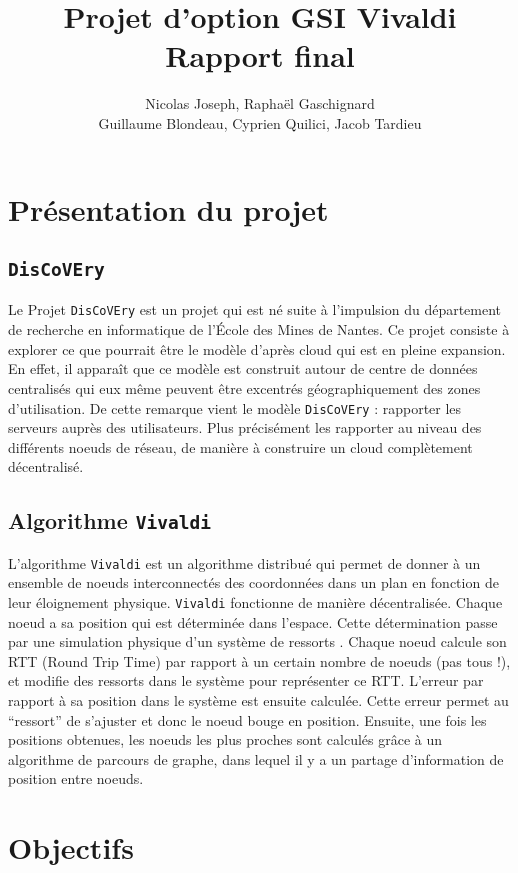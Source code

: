 \documentclass[11pt,a4paper]{article}
\title{Projet d'option GSI Vivaldi \\ Rapport final}
\author{Nicolas Joseph, Raphaël Gaschignard\\ Guillaume Blondeau, Cyprien Quilici, Jacob Tardieu}
\begin{document}
\maketitle
\section{Présentation du projet}
\subsection{\texttt{DisCoVEry}}

Le Projet \texttt{DisCoVEry} est un projet qui est né suite à l’impulsion du département de recherche en informatique de l'École des Mines de Nantes. Ce projet consiste à explorer ce que pourrait être le modèle d’après cloud qui est en pleine expansion. En effet, il apparaît que ce modèle est construit autour de centre de données centralisés qui eux même peuvent être excentrés géographiquement des zones d’utilisation. De cette remarque vient  le modèle \texttt{DisCoVEry} : rapporter les serveurs auprès des utilisateurs. Plus précisément les rapporter au niveau des différents noeuds de réseau, de manière à construire un cloud complètement décentralisé.

\subsection{Algorithme \texttt{Vivaldi}}
L'algorithme \texttt{Vivaldi} \cite{vivaldi} est un algorithme distribué qui permet  de donner à un ensemble de noeuds interconnectés des coordonnées dans un plan en fonction de leur éloignement physique.
\texttt{Vivaldi} fonctionne de manière décentralisée. Chaque noeud a sa position qui est déterminée dans l’espace. Cette détermination passe par une simulation physique d’un système de ressorts . Chaque noeud calcule son RTT (Round Trip Time) par rapport à un certain nombre de noeuds (pas tous !), et modifie des ressorts dans le système pour représenter ce RTT. L’erreur par rapport à sa position dans le système est ensuite calculée. Cette erreur permet au “ressort” de s’ajuster et donc le noeud bouge en position.
Ensuite, une fois les positions obtenues, les noeuds les plus proches sont calculés grâce à un algorithme de parcours de graphe, dans lequel il y a un partage d'information de position entre noeuds.

\section{Objectifs}
\end{document}
